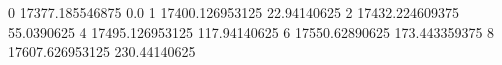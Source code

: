 0 17377.185546875 0.0
1 17400.126953125 22.94140625
2 17432.224609375 55.0390625
4 17495.126953125 117.94140625
6 17550.62890625 173.443359375
8 17607.626953125 230.44140625
